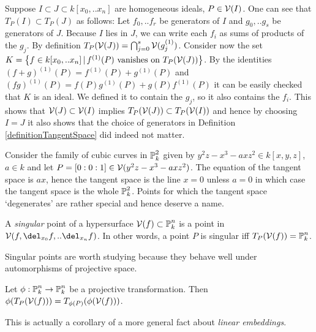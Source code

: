 \begin{example}
Suppose $I \subset J \subset k[x_0,..x_n]$ are homogeneous ideals, $P \in \operatorname{\mathcal V}(I)$.
One can see that $T_P(I) \subset T_P(J)$ as follows: Let $f_0,..f_r$ be generators of $I$ and $g_0,..g_s$ be generators of $J$.
Because $I$ lies in $J$, we can write each $f_i$ as sums of products of the $g_j$.
By definition $T_P(\operatorname{\mathcal V}(J)) = \bigcap_{j=0}^s \operatorname{\mathcal V}(g_j^{(1)})$.
Consider now the set $K = \left\lbrace f \in k[x_0,..x_n] \,|\, f^{(1)}(P) \text{ vanishes on }T_P(\operatorname{\mathcal V}(J))\right\rbrace$.
By the identities $(f+g)^{(1)}(P) = f^{(1)}(P) + g^{(1)}(P)$ and $(fg)^{(1)}(P) = f(P)g^{(1)}(P) + g(P)f^{(1)}(P)$ it can be easily checked that $K$ is an ideal.
We defined it to contain the $g_j$, so it also contains the $f_i$.
This shows that $\operatorname{\mathcal V}(J) \subset \operatorname{\mathcal V}(I)$ implies $T_P(\operatorname{\mathcal V}(J)) \subset T_P(\operatorname{\mathcal V}(I))$ and hence by choosing $I=J$ it also shows that the choice of generators in Definition \ref{definitionTangentSpace} did indeed not matter.
\end{example}

\begin{example}
Consider the family of cubic curves in $\operatorname{\mathbb P}^2_k$ given by $y^2z - x^3 - axz^2 \in k[x,y,z]$, $a \in k$ and let $P = [0:0:1] \in \operatorname{\mathcal V}(y^2z - x^3 - axz^2)$.
The equation of the tangent space is $ax$, hence the tangent space is the line $x = 0$ unless $a = 0$ in which case the tangent space is the whole $\operatorname{\mathbb P}^2_k$.
Points for which the tangent space `degenerates' are rather special and hence deserve a name.
\end{example}


\begin{definition}
A \emph{singular} point of a hypersurface $\operatorname{\mathcal V}(f) \subset \operatorname{\mathbb P}^n_k$ is a point in $\V(f,\del_{x_0}f,..\del_{x_n}f)$.
In other words, a point $P$ is singular iff $T_P(\operatorname{\mathcal V}(f)) = \operatorname{\mathbb P}^n_k$.
\end{definition}

Singular points are worth studying because they behave well under automorphisms of projective space.

\begin{proposition} \label{propositionTangentTransform}
Let $\phi : \operatorname{\mathbb P}^n_k \to \operatorname{\mathbb P}^n_k$ be a projective transformation.
Then $\phi(T_P(\operatorname{\mathcal V}(f))) = T_{\phi(P)}(\phi(\operatorname{\mathcal V}(f)))$.
\end{proposition}

This is actually a corollary of a more general fact about \emph{linear embeddings}.

